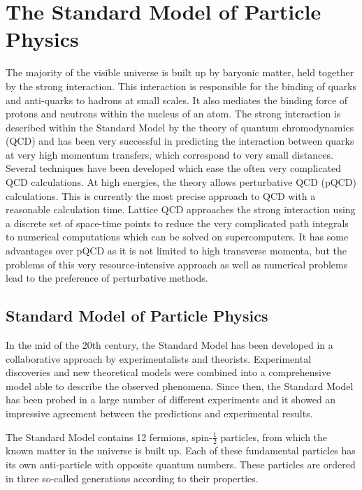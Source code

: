 \chapter{The Standard Model of Particle Physics}

The majority of the visible universe is built up by baryonic matter, held
together by the strong interaction. This interaction is responsible for the
binding of quarks and anti-quarks to hadrons at small scales. It also mediates
the binding force of protons and neutrons within the nucleus of an atom. The
strong interaction is described within the Standard Model by the theory of
quantum chromodynamics (QCD) and has been very successful in predicting the
interaction between quarks at very high momentum transfers, which correspond to
very small distances. Several techniques have been developed which ease the
often very complicated QCD calculations. At high energies, the theory allows
perturbative QCD (pQCD) calculations. This is currently the most precise
approach to QCD with a reasonable calculation time. Lattice QCD approaches the
strong interaction using a discrete set of space-time points to reduce the very
complicated path integrals to numerical computations which can be solved on
supercomputers. It has some advantages over pQCD as it is not limited to high
transverse momenta, but the problems of this very resource-intensive approach as
well as numerical problems lead to the preference of perturbative methods.

\section{Standard Model of Particle Physics}

In the mid of the 20th century, the Standard Model has been developed in a
collaborative approach by experimentalists and theorists. Experimental
discoveries and new theoretical models were combined into a comprehensive model
able to describe the observed phenomena. Since then, the Standard Model has been
probed in a large number of different experiments and it showed an impressive
agreement between the predictions and experimental results.

The Standard Model contains 12 fermions, spin-$\frac{1}{2}$ particles, from
which  the known matter in the universe is built up. Each of these fundamental
particles has its own anti-particle with opposite quantum numbers. These
particles are ordered in three so-called generations according to their
properties.


